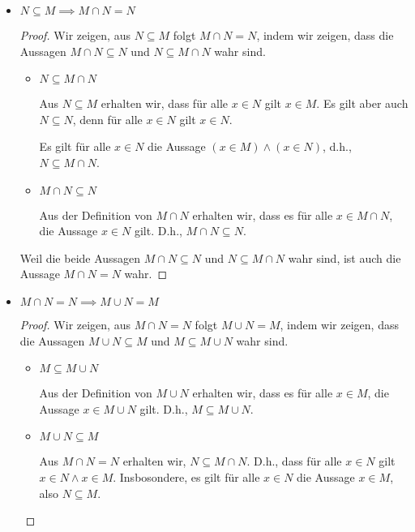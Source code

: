 \documentclass[12pt]{extarticle}
\begin{document}
\begin{itemize}
\item \(N \subseteq M \implies M \cap N = N\)

  \begin{proof}

    Wir zeigen, aus \(N \subseteq M \) folgt \(M \cap N = N\), indem wir
    zeigen, dass die Aussagen  \(M \cap N \subseteq N\) und $N \subseteq M
    \cap N$ wahr sind.
    \begin{itemize}
    \item \(N \subseteq M \cap N\)

      Aus \(N \subseteq M\) erhalten wir, dass für alle \(x \in N\) gilt $x
      \in M$.  Es gilt aber auch \(N \subseteq N\), denn für alle \(x \in N\) gilt
      \(x \in N\).

      Es gilt für alle \(x \in N\) die Aussage $(x \in
      M) \wedge (x \in N)$, d.h., \(N \subseteq M \cap N\).
    \item \(M \cap N \subseteq N\)

      Aus der Definition von \(M \cap N\) erhalten wir, dass es für alle $x \in
      M \cap N$, die Aussage \(x \in N\) gilt.  D.h., \(M \cap N \subseteq N\).
    \end{itemize}


    Weil die beide Aussagen  \(M \cap N \subseteq N\) und $N \subseteq M
    \cap N$ wahr sind, ist auch die Aussage \(M \cap N = N\) wahr.
  \end{proof}
\item \(M \cap N = N \implies M \cup N = M\)

  \begin{proof}

    Wir zeigen, aus \(M \cap N = N \) folgt \(M \cup N = M\), indem wir
    zeigen, dass die Aussagen  \(M \cup N \subseteq M\) und $M \subseteq M
    \cup N$ wahr sind.
    \begin{itemize}
    \item \(M \subseteq M \cup N\)


      Aus der Definition von \(M \cup N\) erhalten wir, dass es für alle $x \in
      M$, die Aussage \(x \in M \cup N\) gilt.  D.h., \(M \subseteq M \cup N\).

    \item \(M \cup N \subseteq M\)

      Aus \(M \cap N = N\) erhalten wir, \(N \subseteq M \cap N\).  D.h., dass
      für alle \(x \in N\) gilt \(x \in N \wedge x \in M\).  Insbosondere, es
      gilt für alle \(x \in N\) die Aussage \(x \in M\), also
      \(N \subseteq M\).


\end{itemize}
\end{proof}
\end{itemize}
\end{document}
